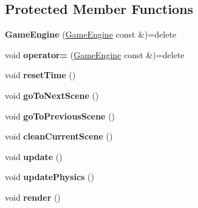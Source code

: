 \subsection*{Protected Member Functions}
\begin{DoxyCompactItemize}
\item 
\hypertarget{class_game_engine_a3577e939b14e8cb0677d508f2f6a6912}{}\label{class_game_engine_a3577e939b14e8cb0677d508f2f6a6912} 
{\bfseries Game\+Engine} (\hyperlink{class_game_engine}{Game\+Engine} const \&)=delete
\item 
\hypertarget{class_game_engine_af1220370747be0fc7c4ca78c089c08c3}{}\label{class_game_engine_af1220370747be0fc7c4ca78c089c08c3} 
void {\bfseries operator=} (\hyperlink{class_game_engine}{Game\+Engine} const \&)=delete
\item 
\hypertarget{class_game_engine_af45dfb1c31ce79d53b00eace85c68063}{}\label{class_game_engine_af45dfb1c31ce79d53b00eace85c68063} 
void {\bfseries reset\+Time} ()
\item 
\hypertarget{class_game_engine_a2a1ee54e0b6fc398feab0597fabf2713}{}\label{class_game_engine_a2a1ee54e0b6fc398feab0597fabf2713} 
void {\bfseries go\+To\+Next\+Scene} ()
\item 
\hypertarget{class_game_engine_a3caea6165710b1cf54c392ee803891c7}{}\label{class_game_engine_a3caea6165710b1cf54c392ee803891c7} 
void {\bfseries go\+To\+Previous\+Scene} ()
\item 
\hypertarget{class_game_engine_a9cf603b0eaae873e5513f752aa2b6fe5}{}\label{class_game_engine_a9cf603b0eaae873e5513f752aa2b6fe5} 
void {\bfseries clean\+Current\+Scene} ()
\item 
\hypertarget{class_game_engine_ae03241b464040b659b6a91f27920e8c3}{}\label{class_game_engine_ae03241b464040b659b6a91f27920e8c3} 
void {\bfseries update} ()
\item 
\hypertarget{class_game_engine_aa79933550f7680ffe62035f5c3181b55}{}\label{class_game_engine_aa79933550f7680ffe62035f5c3181b55} 
void {\bfseries update\+Physics} ()
\item 
\hypertarget{class_game_engine_a267bf9164ba09e32b7a24ba4afb527d4}{}\label{class_game_engine_a267bf9164ba09e32b7a24ba4afb527d4} 
void {\bfseries render} ()
\end{DoxyCompactItemize}
